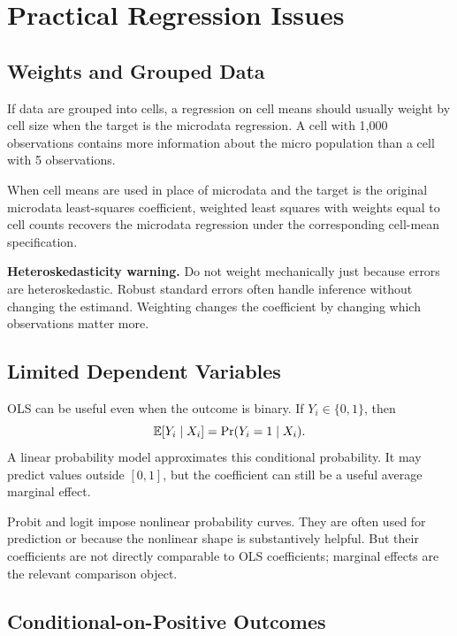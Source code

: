 \section{Practical Regression Issues}

\subsection{Weights and Grouped Data}

If data are grouped into cells, a regression on cell means should usually weight
by cell size when the target is the microdata regression. A cell with 1,000
observations contains more information about the micro population than a cell
with 5 observations.

\begin{thmN}
When cell means are used in place of microdata and the target is the original
microdata least-squares coefficient, weighted least squares with weights equal
to cell counts recovers the microdata regression under the corresponding
cell-mean specification.
\end{thmN}

\begin{boxF}
\textbf{Heteroskedasticity warning.} Do not weight mechanically just because
errors are heteroskedastic. Robust standard errors often handle inference
without changing the estimand. Weighting changes the coefficient by changing
which observations matter more.
\end{boxF}

\subsection{Limited Dependent Variables}

OLS can be useful even when the outcome is binary. If \(Y_i\in\{0,1\}\), then
\[
    \mathbb{E}[Y_i\mid X_i]=\Pr(Y_i=1\mid X_i).
\]
A linear probability model approximates this conditional probability. It may
predict values outside \([0,1]\), but the coefficient can still be a useful
average marginal effect.

Probit and logit impose nonlinear probability curves. They are often used for
prediction or because the nonlinear shape is substantively helpful. But their
coefficients are not directly comparable to OLS coefficients; marginal effects
are the relevant comparison object.

\subsection{Conditional-on-Positive Outcomes}

